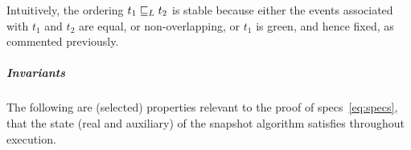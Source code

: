 Intuitively, the ordering $t_1 \mathrel{\sqsubseteq_L} t_2$ is stable because either the
events associated with $t_1$ and $t_2$ are equal, or non-overlapping,
or $t_1$ is green, and hence fixed, as commented previously.


\subparagraph*{Invariants}%
The following are (selected) properties relevant to the proof of
specs~\eqref{eq:specs}, that the state (real and auxiliary) of the snapshot
algorithm satisfies throughout execution.
